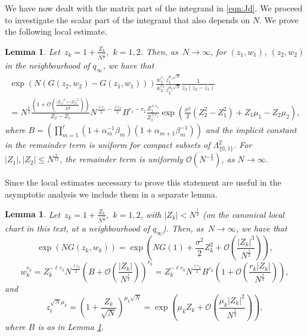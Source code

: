 \documentclass[11pt]{article}
\theoremstyle{plain}
\newtheorem{lemma}[theorem]{Lemma}
\theoremstyle{definition}
\numberwithin{equation}{section}
\begin{document}
%
 
%


%
We have now dealt with the matrix part of the integrand in \eqref{eqn:Jd}.
We proceed to investigate the scalar part of the integrand that also depends on $N$. We prove the following local estimate.

\begin{lemma}\label{lemma:local_action_function}
Let~$z_k=1+\frac{Z_k}{N^\frac{1}{2}}$,~$k=1,2$. Then, as~$N\to \infty$, for $(z_1,w_1)$,  $(z_2,w_2)$ in the neighbourhood of $q_{\infty}$, we have that
\begin{multline} \label{eqn:integrand_near_q_infinity}
\exp\left({N(G(z_2,w_2)-G(z_1,w_1))}\right)
\frac{w_1^{r_1}}{w_2^{r_2}}
 \frac{z_1^{\mu_1\sqrt{N}}}{z_2^{\mu_2\sqrt{N}}}
 \frac{1}{z_2(z_2-z_1)}
\\= N^{\frac{1}{2}} \frac{\left(1+\mathcal{O}\left( \frac{|Z_1|^3+|Z_2|^3}{N^{\frac{1}{2}}} \right)\right)}{Z_2-Z_1} 
 N^{\frac{\ell r_1}{2}-\frac{\ell r_2}{2}} 
B^{ r_1- r_2} 
\frac{Z_2^{\ell r_2}}{Z_1^{\ell r_1}}
\exp\left(\frac{\sigma^2}{2}(Z_2^2-Z_1^2)+Z_1\mu_1-Z_2\mu_2\right),
\end{multline}
where $B=\left(\prod_{m=1}^\ell(1+\alpha_m^{-1}\beta_m)(1+\alpha_{m+1}\beta_m^{-1})\right)$ and the implicit constant in the remainder term is uniform for compact subsets of $\Lambda_{\{0,1\}}^2$. 
 For $|Z_1|, |Z_2| \leq N^{\frac{1}{12}}$, the remainder term
 is uniformly $\mathcal{O}(N^{-\frac{1}{4}})$, as $N\rightarrow\infty$.
\end{lemma}

Since the local estimates necessary to prove this statement are useful in the asymptotic analysis we include them in a separate lemma. 
\begin{lemma}\label{lemma:expansions}
Let~$z_k=1+\frac{Z_k}{N^\frac{1}{2}}$,~$k=1,2$, with $|Z_k|< N^{\frac{1}{2}}$ (on the canonical local chart in this text, at a neighbourhood of $q_{\infty}$). Then, as~$N\to \infty$, we have that
\begin{equation} \label{eqn:local_action_contribution}
\exp(NG(z_k,w_k))= \exp\left(NG(1)+\frac{\sigma^2}{2}Z_k^2+\mathcal{O}\left(\frac{|Z_k|^3}{N^{\frac{1}{2}}}\right)\right),
\end{equation}
\begin{equation} \label{eqn:local_w_contribution}
w_k^{r_k}=
Z_k^{-\ell r_k} 
N^{\frac{\ell r_k}{2}} 
\left(B+\mathcal{O}\left(\frac{|Z_k|}{N^{\frac{1}{2}}}\right)\right)^{r_k}
=
Z_k^{-\ell r_k} 
N^{\frac{\ell r_k}{2}} 
B^{r_k}\left(1+\mathcal{O}\left(\frac{r_k |Z_k|}{N^{\frac{1}{2}}}\right)\right),
\end{equation}
and
\begin{equation} \label{eqn:local_z_contribution}
z_i^{\sqrt{N}\mu_k}=\left(1+\frac{Z_k}{ \sqrt{N}}\right)^{\mu_k\sqrt{N}}=\exp\left(\mu_k Z_k+\mathcal{O}\left(\frac{\mu_k |Z_k|^2}{N^{\frac{1}{2}}}\right)\right),
\end{equation}
where $B$ is as in Lemma \ref{lemma:local_action_function}.
\end{lemma}
\end{document}
